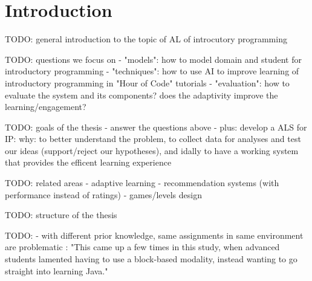 \chapter{Introduction}
\label{chap:introduction}

TODO: general introduction to the topic of AL of introcutory programming

TODO: questions we focus on
- "models": how to model domain and student for introductory programming
- "techniques": how to use AI to improve learning of introductory programming
  in "Hour of Code" tutorials
- "evaluation": how to evaluate the system and its components?
  does the adaptivity improve the learning/engagement?

TODO: goals of the thesis
- answer the questions above
- plus: develop a ALS for IP: why: to better understand the problem,
  to collect data for analyses and test our ideas (support/reject our hypotheses),
  and idally to have a working system that provides the efficent learning experience


TODO: related areas
- adaptive learning
- recommendation systems (with performance instead of ratings)
- games/levels design


TODO: structure of the thesis


TODO:
- with different prior knowledge, same assignments in same environment are problematic
\cite{comparing-blocks-text-weintrop2017}:
"This came up a few times in this study, when advanced students lamented
having to use a block-based modality, instead wanting to go straight into learning Java."
